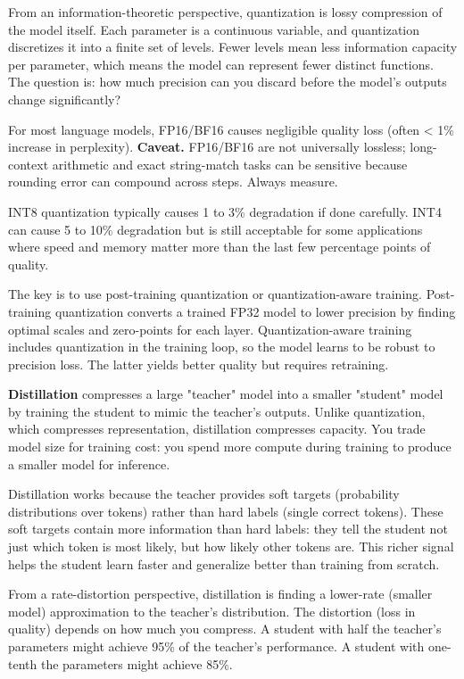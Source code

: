 From an information-theoretic perspective, quantization is lossy compression of the model itself. Each parameter is a continuous variable, and quantization discretizes it into a finite set of levels. Fewer levels mean less information capacity per parameter, which means the model can represent fewer distinct functions. The question is: how much precision can you discard before the model's outputs change significantly?

For most language models, FP16/BF16 causes negligible quality loss (often < 1\% increase in perplexity). \textbf{Caveat.} FP16/BF16 are not universally lossless; long-context arithmetic and exact string-match tasks can be sensitive because rounding error can compound across steps. Always measure.

INT8 quantization typically causes 1 to 3\% degradation if done carefully. INT4 can cause 5 to 10\% degradation but is still acceptable for some applications where speed and memory matter more than the last few percentage points of quality.

The key is to use post-training quantization or quantization-aware training. Post-training quantization converts a trained FP32 model to lower precision by finding optimal scales and zero-points for each layer. Quantization-aware training includes quantization in the training loop, so the model learns to be robust to precision loss. The latter yields better quality but requires retraining.

\textbf{Distillation} compresses a large "teacher" model into a smaller "student" model by training the student to mimic the teacher's outputs. Unlike quantization, which compresses representation, distillation compresses capacity. You trade model size for training cost: you spend more compute during training to produce a smaller model for inference.

Distillation works because the teacher provides soft targets (probability distributions over tokens) rather than hard labels (single correct tokens). These soft targets contain more information than hard labels: they tell the student not just which token is most likely, but how likely other tokens are. This richer signal helps the student learn faster and generalize better than training from scratch.

From a rate-distortion perspective, distillation is finding a lower-rate (smaller model) approximation to the teacher's distribution. The distortion (loss in quality) depends on how much you compress. A student with half the teacher's parameters might achieve 95\% of the teacher's performance. A student with one-tenth the parameters might achieve 85\%.

